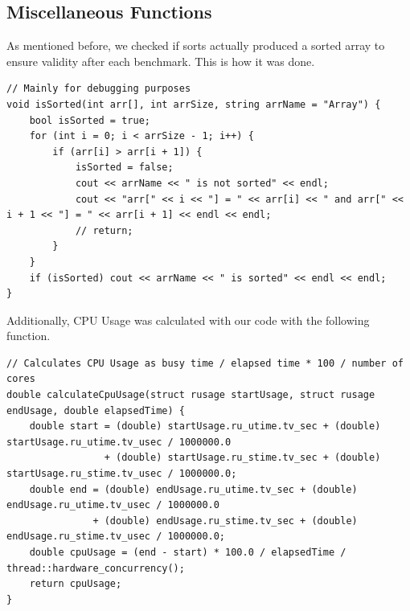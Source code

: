 \documentclass[conference]{IEEEtran}
\begin{document}
\subsection{Miscellaneous Functions}
As mentioned before, we checked if sorts actually produced a sorted array to ensure validity after each benchmark. This is how it was done.
\begin{lstlisting}
// Mainly for debugging purposes
void isSorted(int arr[], int arrSize, string arrName = "Array") {
    bool isSorted = true;
    for (int i = 0; i < arrSize - 1; i++) {
        if (arr[i] > arr[i + 1]) {
            isSorted = false;
            cout << arrName << " is not sorted" << endl;
            cout << "arr[" << i << "] = " << arr[i] << " and arr[" << i + 1 << "] = " << arr[i + 1] << endl << endl;
            // return;
        }
    }
    if (isSorted) cout << arrName << " is sorted" << endl << endl;
}
\end{lstlisting}
Additionally, CPU Usage was calculated with our code with the following function.
\begin{lstlisting}
// Calculates CPU Usage as busy time / elapsed time * 100 / number of cores
double calculateCpuUsage(struct rusage startUsage, struct rusage endUsage, double elapsedTime) {
    double start = (double) startUsage.ru_utime.tv_sec + (double) startUsage.ru_utime.tv_usec / 1000000.0
                 + (double) startUsage.ru_stime.tv_sec + (double) startUsage.ru_stime.tv_usec / 1000000.0;
    double end = (double) endUsage.ru_utime.tv_sec + (double) endUsage.ru_utime.tv_usec / 1000000.0
               + (double) endUsage.ru_stime.tv_sec + (double) endUsage.ru_stime.tv_usec / 1000000.0;
    double cpuUsage = (end - start) * 100.0 / elapsedTime / thread::hardware_concurrency();
    return cpuUsage;
}
\end{lstlisting}
\end{document}
